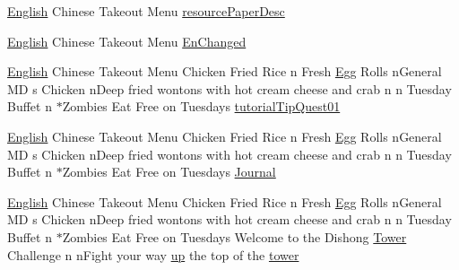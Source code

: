 \begin{DoxyCompactItemize}
\item 
\mbox{\hyperlink{_sphere_i_i_01_winter_01_project_2_config_2_localization_8txt_ad896b63205779b1b09e86d941ce13976}{English}} Chinese Takeout Menu \mbox{\hyperlink{_dishong_01_tower_01_challenge_2_config_2_localization_8txt_a0908175035e4f29928ff117ea7c860f2}{resource\+Paper\+Desc}}
\item 
\mbox{\hyperlink{_sphere_i_i_01_winter_01_project_2_config_2_localization_8txt_ad896b63205779b1b09e86d941ce13976}{English}} Chinese Takeout Menu \mbox{\hyperlink{_dishong_01_tower_01_challenge_2_config_2_localization_8txt_a279622364c8fda27d2ce2e3f8b02ff5f}{En\+Changed}}
\item 
\mbox{\hyperlink{_sphere_i_i_01_winter_01_project_2_config_2_localization_8txt_ad896b63205779b1b09e86d941ce13976}{English}} Chinese Takeout Menu Chicken Fried Rice n Fresh \mbox{\hyperlink{_sphere_i_i_01_winter_01_project_2_config_2_localization_8txt_a55334ab0b48a68a93004334728020f15}{Egg}} Rolls n\+General MD s Chicken n\+Deep fried wontons with hot cream cheese and crab n n Tuesday Buffet n $\ast$Zombies Eat Free on Tuesdays \mbox{\hyperlink{_dishong_01_tower_01_challenge_2_config_2_localization_8txt_ab9f78a0790e5a6b92fc724fe5adb3d40}{tutorial\+Tip\+Quest01}}
\item 
\mbox{\hyperlink{_sphere_i_i_01_winter_01_project_2_config_2_localization_8txt_ad896b63205779b1b09e86d941ce13976}{English}} Chinese Takeout Menu Chicken Fried Rice n Fresh \mbox{\hyperlink{_sphere_i_i_01_winter_01_project_2_config_2_localization_8txt_a55334ab0b48a68a93004334728020f15}{Egg}} Rolls n\+General MD s Chicken n\+Deep fried wontons with hot cream cheese and crab n n Tuesday Buffet n $\ast$Zombies Eat Free on Tuesdays \mbox{\hyperlink{_dishong_01_tower_01_challenge_2_config_2_localization_8txt_a439eb818804ef3647145a6ddb30164e0}{Journal}}
\item 
\mbox{\hyperlink{_sphere_i_i_01_winter_01_project_2_config_2_localization_8txt_ad896b63205779b1b09e86d941ce13976}{English}} Chinese Takeout Menu Chicken Fried Rice n Fresh \mbox{\hyperlink{_sphere_i_i_01_winter_01_project_2_config_2_localization_8txt_a55334ab0b48a68a93004334728020f15}{Egg}} Rolls n\+General MD s Chicken n\+Deep fried wontons with hot cream cheese and crab n n Tuesday Buffet n $\ast$Zombies Eat Free on Tuesdays Welcome to the Dishong \mbox{\hyperlink{_dishong_01_tower_01_challenge_2_config_2_localization_8txt_ad03a7286db82f171f8e82a1eaf4e3eaf}{Tower}} Challenge n n\+Fight your way \mbox{\hyperlink{_the_01_restless_01_curse_2_config_2_localization_01-_01_quest_8txt_a2f8d5a9cc6c08e259de10d34d28f85c4}{up}} the top of the \mbox{\hyperlink{_dishong_01_tower_01_challenge_2_config_2_localization_8txt_a57c8a1939d85714b9d31af42de2479b4}{tower}}

\end{DoxyCompactItemize}
